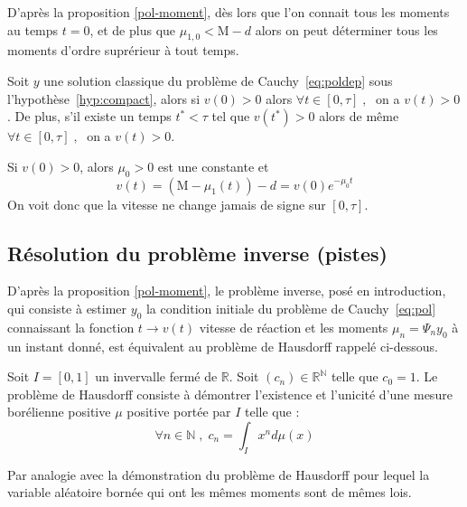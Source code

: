 \documentclass[a4paper]{article}
\newcommand{\mass}{\mathrm{M}}
\newcommand{\dep}{d}
\begin{document}
D'après la proposition \ref{pol-moment}, 
dès lors que l'on connait tous les moments au temps $t=0$, 
et de plus que $\mu_{1,0}<\mass-\dep$
alors on peut déterminer tous les moments d'ordre suprérieur à tout temps.

\begin{proposition}
	\label{prop:vp}
	Soit $y$ une solution classique du problème de Cauchy~\eqref{eq:poldep} sous l'hypothèse~\eqref{hyp:compact}, alors si $v(0) >0 $ alors $\forall t \in [0,\tau] \;, \;$ on a $v(t) >0$ . De plus, s'il existe un temps $t^*<\tau$ tel que $v(t^*) >0$ alors de même $\forall t \in [0,\tau] \;, \;$ on a $v(t) >0$.
\end{proposition}

\begin{preuve}
	Si $v(0)>0$, alors $\mu_0>0$ est une constante et 
	\[ v(t) = ( \mass - \mu_1 (t)) - \dep = v(0)e^{- \mu_0 t} \]
	On voit donc que la vitesse ne change jamais de signe sur $[0,\tau]$.
\end{preuve}


\subsection{Résolution du problème inverse (pistes)}

D'après la proposition \ref{pol-moment}, le problème inverse, posé en introduction, qui consiste à estimer $y_0$ la condition initiale du problème de Cauchy~\eqref{eq:pol} connaissant la fonction  $t \to v(t)$ vitesse de réaction et les moments $\mu_n= \Psi_ny_0$ à un instant donné, est équivalent au problème de Hausdorff rappelé ci-dessous.

\begin{definition}
	Soit $I=[0,1]$ un invervalle fermé de $\mathbb{R}$. Soit $(c_n)\in\mathbb{R}^{\mathbb{N}}$ telle que $c_0=1$.
	Le problème de Hausdorff consiste à démontrer l'existence et l'unicité d'une mesure borélienne positive $\mu$ positive portée par $I$ telle que :
	\[ \forall n \in \mathbb{N} \; ,\; c_n =\int_I x^n d\mu(x) \]
\end{definition}

Par analogie avec la démonstration du problème de Hausdorff pour lequel la variable aléatoire bornée qui ont les mêmes moments sont de mêmes lois.
\end{document}
